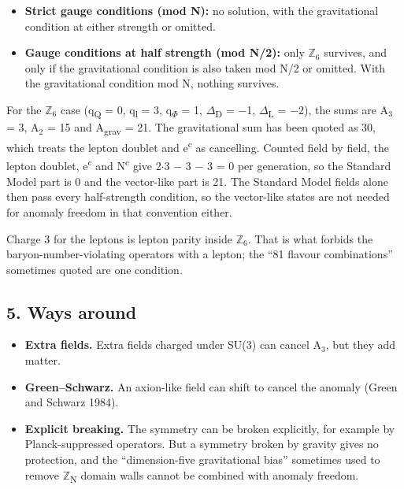 \documentclass[
  11pt,
]{article}
\providecommand{\tightlist}{%
  \setlength{\itemsep}{0pt}\setlength{\parskip}{0pt}}
\begin{document}
\begin{itemize}
\tightlist
\item
  \textbf{Strict gauge conditions (mod N):} no solution, with the gravitational condition at either strength or omitted.
\item
  \textbf{Gauge conditions at half strength (mod N/2):} only \ensuremath{\mathbb{Z}}\ensuremath{_{6}} survives, and only if the gravitational condition is also taken mod N/2 or omitted. With the gravitational condition mod N, nothing survives.
\end{itemize}

For the \ensuremath{\mathbb{Z}}\ensuremath{_{6}} case (q\textsubscript{Q} = 0, q\textsubscript{l} = 3, q\textsubscript{\ensuremath{\Phi}} = 1, \ensuremath{\Delta}\textsubscript{D} = \ensuremath{-}1, \ensuremath{\Delta}\textsubscript{L} = \ensuremath{-}2), the sums are A\ensuremath{_{3}} = 3, A\ensuremath{_{2}} = 15 and A\textsubscript{grav} = 21. The gravitational sum has been quoted as 30, which treats the lepton doublet and e\textsuperscript{c} as cancelling. Counted field by field, the lepton doublet, e\textsuperscript{c} and N\textsuperscript{c} give 2\ensuremath{\cdot}3 \ensuremath{-} 3 \ensuremath{-} 3 = 0 per generation, so the Standard Model part is 0 and the vector-like part is 21. The Standard Model fields alone then pass every half-strength condition, so the vector-like states are not needed for anomaly freedom in that convention either.

Charge 3 for the leptons is lepton parity inside \ensuremath{\mathbb{Z}}\ensuremath{_{6}}. That is what forbids the baryon-number-violating operators with a lepton; the ``81 flavour combinations'' sometimes quoted are one condition.

\hypertarget{ways-around}{%
\subsection{5. Ways around}\label{ways-around}}

\begin{itemize}
\tightlist
\item
  \textbf{Extra fields.} Extra fields charged under SU(3) can cancel A\ensuremath{_{3}}, but they add matter.
\item
  \textbf{Green--Schwarz.} An axion-like field can shift to cancel the anomaly (Green and Schwarz 1984).
\item
  \textbf{Explicit breaking.} The symmetry can be broken explicitly, for example by Planck-suppressed operators. But a symmetry broken by gravity gives no protection, and the ``dimension-five gravitational bias'' sometimes used to remove \ensuremath{\mathbb{Z}}\textsubscript{N} domain walls cannot be combined with anomaly freedom.
\end{itemize}
\end{document}

